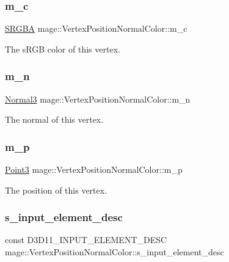 \subsubsection{\texorpdfstring{m\+\_\+c}{m\_c}}
{\footnotesize\ttfamily \hyperlink{structmage_1_1_s_r_g_b_a}{S\+R\+G\+BA} mage\+::\+Vertex\+Position\+Normal\+Color\+::m\+\_\+c}

The s\+R\+GB color of this vertex. \hypertarget{structmage_1_1_vertex_position_normal_color_aea2aa7191c054a17093310c20201020b}{}\label{structmage_1_1_vertex_position_normal_color_aea2aa7191c054a17093310c20201020b} 
\subsubsection{\texorpdfstring{m\+\_\+n}{m\_n}}
{\footnotesize\ttfamily \hyperlink{structmage_1_1_normal3}{Normal3} mage\+::\+Vertex\+Position\+Normal\+Color\+::m\+\_\+n}

The normal of this vertex. \hypertarget{structmage_1_1_vertex_position_normal_color_a4e5a4dff047da3d9b433a52d11584b54}{}\label{structmage_1_1_vertex_position_normal_color_a4e5a4dff047da3d9b433a52d11584b54} 
\subsubsection{\texorpdfstring{m\+\_\+p}{m\_p}}
{\footnotesize\ttfamily \hyperlink{structmage_1_1_point3}{Point3} mage\+::\+Vertex\+Position\+Normal\+Color\+::m\+\_\+p}

The position of this vertex. \hypertarget{structmage_1_1_vertex_position_normal_color_a1d14ae159608683093a33b38fb6259e4}{}\label{structmage_1_1_vertex_position_normal_color_a1d14ae159608683093a33b38fb6259e4} 
\subsubsection{\texorpdfstring{s\+\_\+input\+\_\+element\+\_\+desc}{s\_input\_element\_desc}}
{\footnotesize\ttfamily const D3\+D11\+\_\+\+I\+N\+P\+U\+T\+\_\+\+E\+L\+E\+M\+E\+N\+T\+\_\+\+D\+E\+SC mage\+::\+Vertex\+Position\+Normal\+Color\+::s\+\_\+input\+\_\+element\+\_\+desc\hspace{0.3cm}{\ttfamily [static]}}


